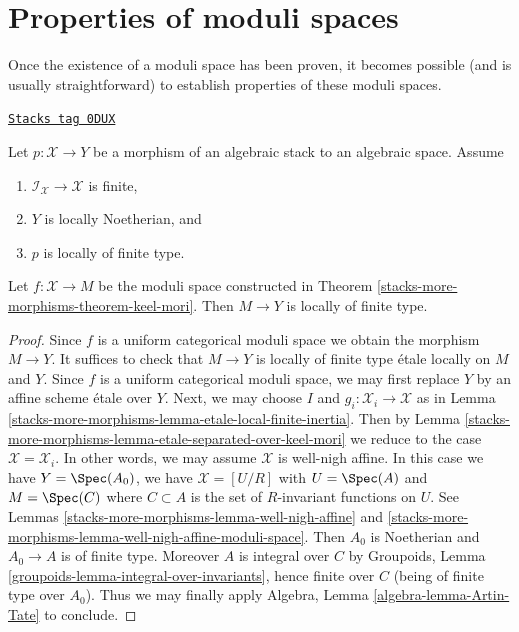 \section{Properties of moduli spaces}
\label{stacks-more-morphisms-section-properties-moduli-spaces}
Once the existence of a moduli space has been proven,
it becomes possible (and is usually straightforward) to
establish properties of these moduli spaces.

\begin{lemma}
\label{stacks-more-morphisms-lemma-keel-mori-finite-type}
\href{https://stacks.math.columbia.edu/tag/0DUX}{\texttt{Stacks tag 0DUX}}

Let $p : \mathcal{X} \to Y$ be a morphism of an algebraic stack to an
algebraic space. Assume
\begin{enumerate}
\item $\mathcal{I}_\mathcal{X} \to \mathcal{X}$ is finite,
\item $Y$ is locally Noetherian, and
\item $p$ is locally of finite type.
\end{enumerate}
Let $f : \mathcal{X} \to M$ be the moduli space constructed in
Theorem \ref{stacks-more-morphisms-theorem-keel-mori}.
Then $M \to Y$ is locally of finite type.
\end{lemma}

\begin{proof}
Since $f$ is a uniform categorical moduli space we obtain the
morphism $M \to Y$. It suffices to check that $M \to Y$
is locally of finite type \'etale locally on $M$ and $Y$.
Since $f$ is a uniform categorical moduli space, we
may first replace $Y$ by an affine scheme \'etale over $Y$.
Next, we may choose $I$ and $g_i : \mathcal{X}_i \to \mathcal{X}$
as in Lemma \ref{stacks-more-morphisms-lemma-etale-local-finite-inertia}.
Then by Lemma \ref{stacks-more-morphisms-lemma-etale-separated-over-keel-mori}
we reduce to the case $\mathcal{X} = \mathcal{X}_i$.
In other words, we may assume $\mathcal{X}$ is well-nigh affine.
In this case we have $Y = \Spec(A_0)$, we have
$\mathcal{X} = [U/R]$ with $U = \Spec(A)$ and
$M = \Spec(C)$ where $C \subset A$ is the set of $R$-invariant
functions on $U$. See
Lemmas \ref{stacks-more-morphisms-lemma-well-nigh-affine} and
\ref{stacks-more-morphisms-lemma-well-nigh-affine-moduli-space}.
Then $A_0$ is Noetherian and $A_0 \to A$ is of finite type.
Moreover $A$ is integral over $C$ by
Groupoids, Lemma \ref{groupoids-lemma-integral-over-invariants},
hence finite over $C$
(being of finite type over $A_0$).
Thus we may finally apply
Algebra, Lemma \ref{algebra-lemma-Artin-Tate}
to conclude.
\end{proof}

